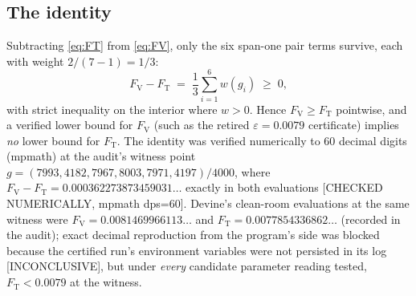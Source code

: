 \documentclass[11pt]{article}
\newcommand{\eps}{\varepsilon}
\newcommand{\Fv}{F_{\mathrm{V}}}
\newcommand{\Ft}{F_{\mathrm{T}}}
\begin{document}
\subsection{The identity}
Subtracting \eqref{eq:FT} from \eqref{eq:FV}, only the six span-one pair terms
survive, each with weight $2/(7-1) = 1/3$:
\begin{equation}
\label{eq:identity}
\Fv - \Ft \;=\; \frac13 \sum_{i=1}^{6} w(g_i) \;\ge\; 0,
\end{equation}
with strict inequality on the interior where $w>0$. Hence $\Fv \ge \Ft$
pointwise, and a verified lower bound for $\Fv$ (such as the retired
$\eps = 0.0079$ certificate) implies \emph{no} lower bound for $\Ft$. The
identity was verified numerically to 60 decimal digits (mpmath) at the audit's
witness point $g = (7993,4182,7967,8003,7971,4197)/4000$, where
$\Fv - \Ft = 0.000362273873459031\ldots$ exactly in both evaluations
[CHECKED NUMERICALLY, mpmath dps=60]. Devine's clean-room evaluations at the
same witness were $\Fv = 0.0081469966113\ldots$ and $\Ft = 0.0077854336862\ldots$
(recorded in the audit); exact decimal reproduction from the program's side was
blocked because the certified run's environment variables were not persisted in
its log [INCONCLUSIVE], but under \emph{every} candidate parameter reading
tested, $\Ft < 0.0079$ at the witness.
\end{document}
